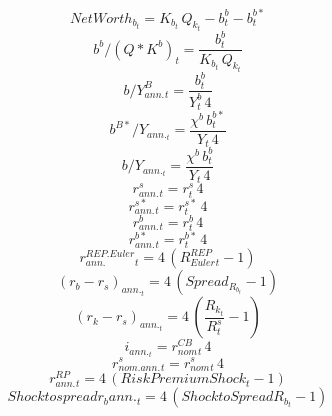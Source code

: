 \documentclass[10pt,a4paper]{article}
\begin{document}
\begin{dmath}
 NetWorth_b _{t}=K_b_{t}\,  Q_k _{t}-b^b_{t}-b^{b*}_{t}
\end{dmath}
\begin{dmath}
 b^b / (Q * K^b) _{t}=\frac{b^b_{t}}{K_b_{t}\,  Q_k _{t}}
\end{dmath}
\begin{dmath}
 b / Y^B_{ann.} _{t}=\frac{b^b_{t}}{Y^b_{t}\, 4}
\end{dmath}
\begin{dmath}
 b^{B*}/ Y_{ann.} _{t}=\frac{\chi^b \, b^{b*}_{t}}{Y_{t}\, 4}
\end{dmath}
\begin{dmath}
b/ Y_{ann.} _{t}=\frac{\chi^b \, b^b_{t}}{Y_{t}\, 4}
\end{dmath}
\begin{dmath}
r^s_{ann.}_{t}=r^s_{t}\, 4
\end{dmath}
\begin{dmath}
r^{s*}_{ann.}_{t}=r^{s*}_{t}\, 4
\end{dmath}
\begin{dmath}
r^b_{ann.}_{t}=r^b_{t}\, 4
\end{dmath}
\begin{dmath}
r^{b*}_{ann.}_{t}=r^{b*}_{t}\, 4
\end{dmath}
\begin{dmath}
 r^{REP.Euler}_{ann.} _{t}=4\, \left( R^{REP}_{Euler} _{t}-1\right)
\end{dmath}
\begin{dmath}
 (r_b - r_s)_{ann.} _{t}=4\, \left(Spread_R_b_{t}-1\right)
\end{dmath}
\begin{dmath}
 (r_k - r_s)_{ann.} _{t}=4\, \left(\frac{ R_k _{t}}{R^s_{t}}-1\right)
\end{dmath}
\begin{dmath}
 i_{ann.}_{t}= r^{CB}_{nom}_{t}\, 4
\end{dmath}
\begin{dmath}
 r^s_{nom.ann.}_{t}= r^s_{nom}_{t}\, 4
\end{dmath}
\begin{dmath}
 r^{RP}_{ann.}_{t}=4\, \left( Risk Premium Shock _{t}-1\right)
\end{dmath}
\begin{dmath}
Shock to spread r_b ann._{t}=4\, \left(Shock to Spread R_b_{t}-1\right)
\end{dmath}
\end{document}
